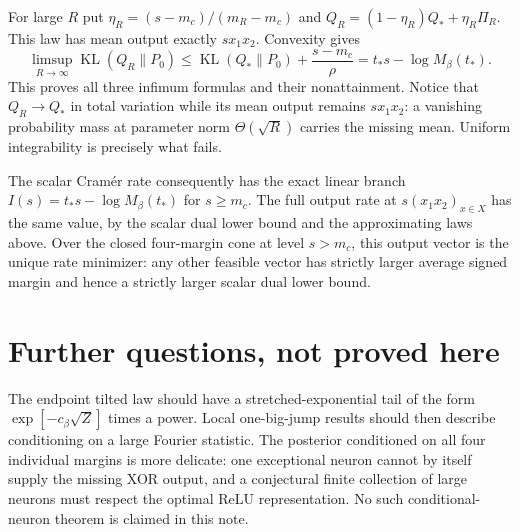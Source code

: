 \documentclass[11pt]{article}
\newcommand{\KL}{\operatorname{KL}}
\begin{document}
For large $R$ put $\eta_R=(s-m_c)/(m_R-m_c)$ and
$Q_R=(1-\eta_R)Q_*+\eta_R\Pi_R$. This law has mean output exactly
$s x_1x_2$. Convexity gives
\[
 \limsup_{R\to\infty}\KL(Q_R\|P_0)
 \le\KL(Q_*\|P_0)+\frac{s-m_c}{\rho}
 =t_*s-\log M_\beta(t_*).
\]
This proves all three infimum formulas and their nonattainment. Notice
that $Q_R\to Q_*$ in total variation while its mean output remains
$s x_1x_2$: a vanishing probability mass at parameter norm $\Theta(\sqrt R)$
carries the missing mean. Uniform integrability is precisely what fails.

The scalar Cram\'er rate consequently has the exact linear branch
$I(s)=t_*s-\log M_\beta(t_*)$ for $s\ge m_c$. The full output rate at
$s(x_1x_2)_{x\in X}$ has the same value, by the scalar dual lower bound
and the approximating laws above. Over the closed four-margin cone at
level $s>m_c$, this output vector is the unique rate minimizer: any
other feasible vector has strictly larger average signed margin and
hence a strictly larger scalar dual lower bound.

\section{Further questions, not proved here}
The endpoint tilted law should have a stretched-exponential tail of the
form $\exp[-c_\beta\sqrt Z]$ times a power. Local one-big-jump results
should then describe conditioning on a large Fourier statistic. The
posterior conditioned on all four individual margins is more delicate:
one exceptional neuron cannot by itself supply the missing XOR output,
and a conjectural finite collection of large neurons must respect the
optimal ReLU representation. No such conditional-neuron theorem is
claimed in this note.
\end{document}

